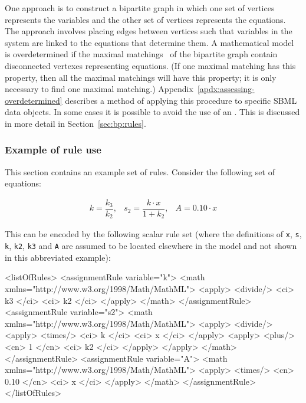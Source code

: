 One approach is to construct a bipartite graph in which one set of
vertices represents the variables and the other set of vertices
represents the equations.  The approach involves placing edges
between vertices such that variables in the system are linked to
the equations that determine them.  A mathematical model is
overdetermined if the maximal matchings~\citep{chartrand_1977} of
the bipartite graph contain disconnected vertexes representing
equations.  (If one maximal matching has this property, then all
the maximal matchings will have this property; \ie it is only
necessary to find one maximal matching.)
Appendix~\ref{apdx:assessing-overdetermined} describes a method of
applying this procedure to specific SBML data objects.  In some
cases it is possible to avoid the use of an \AlgebraicRule.  This
is discussed in more detail in Section~\ref{sec:bp:rules}.


\subsubsection{Example of rule use}
\label{sec:eg-rule-use}

This section contains an example set of rules.  Consider the
following set of equations:
\begin{linenomath}
  \begin{equation*}
    \begin{array}{lll}
      k = \dfrac{k_3}{k_2}, & s_2 = \dfrac{k \cdot x}{1 + k_2}, & A = 0.10 \cdot x
    \end{array}
  \end{equation*}
\end{linenomath}
This can be encoded by the following scalar rule set (where the
definitions of \texttt{x}, \texttt{s}, \texttt{k}, \texttt{k2},
\texttt{k3} and \texttt{A} are assumed to be located elsewhere in
the model and not shown in this abbreviated example):

\begin{example}
<listOfRules>
    <assignmentRule variable="k">
        <math xmlns="http://www.w3.org/1998/Math/MathML">
            <apply> <divide/> <ci> k3 </ci> <ci> k2 </ci> </apply>
        </math>
    </assignmentRule>
    <assignmentRule variable="s2">
        <math xmlns="http://www.w3.org/1998/Math/MathML">
            <apply>
                <divide/>
                    <apply> <times/> <ci> k </ci> <ci> x </ci> </apply>
                    <apply> <plus/> <cn> 1 </cn> <ci> k2 </ci> </apply>
            </apply>
        </math>
    </assignmentRule>
    <assignmentRule variable="A">
        <math xmlns="http://www.w3.org/1998/Math/MathML">
            <apply> <times/> <cn> 0.10 </cn> <ci> x </ci> </apply>
        </math>
    </assignmentRule>
</listOfRules>
\end{example}


